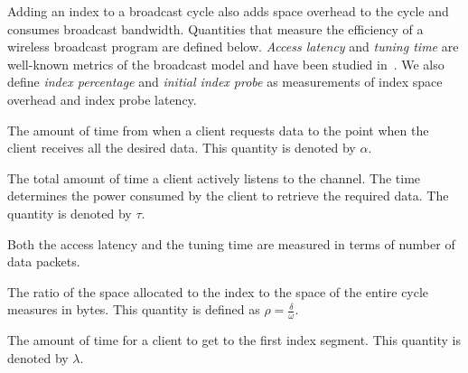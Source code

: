 Adding an index to a broadcast cycle also adds space overhead to
the cycle and consumes broadcast bandwidth. Quantities that
measure the efficiency of a wireless broadcast program are defined
below. \emph{Access latency} and \emph{tuning time} are well-known
metrics of the broadcast model and have been studied
in~\cite{journals/vldb/ZhengLLLS09,journals/tkde/ImielinskiVB97,
conf/icde/KuZW07,journals/tmc/KuZW08,journals/winet/LeeL99}. We
also define \emph{index percentage} and \emph{initial index probe}
as measurements of index space overhead and index probe latency.

\begin{definition}\label{def:access_latency}
The amount of time from when a client requests data to the point
when the client receives all the desired data. This quantity is
denoted by $\alpha$.
\end{definition}

\begin{definition}\label{def:tuning_time}
The total amount of time a client actively listens to the channel.
The time determines the power consumed by the client to retrieve
the required data. The quantity is denoted by $\tau$.
\end{definition}

Both the access latency and the tuning time are measured in terms
of number of data packets.

\begin{definition}\label{def:index_percentage}
The ratio of the space allocated to the index to the space of the
entire cycle measures in bytes. This quantity is defined as $\rho
= \frac{\delta}{\omega}$.
\end{definition}

\begin{definition}\label{def:index_probe}
The amount of time for a client to get to the first index segment.
This quantity is denoted by $\lambda$.
\end{definition}


